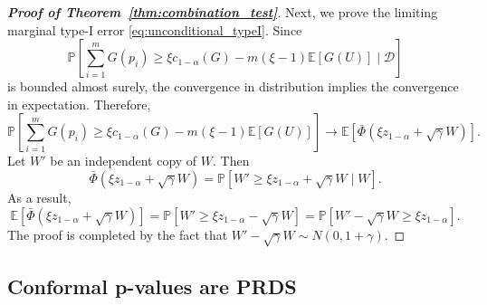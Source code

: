 \documentclass[11pt]{article}
\def\E{\mathbb{E}}
\renewcommand{\P}{\mathbb{P}}
\begin{document}
\begin{proof}[\textbf{Proof of Theorem~\ref{thm:combination_test}}]
Next, we prove the limiting marginal type-I error \eqref{eq:unconditional_typeI}. Since $$\P\left[\sum_{i=1}^{m}G(p_i)\ge \xi c_{1 - \alpha}(G) - m(\xi - 1)\E[G(U)] \mid \mathcal{D} \right]$$ is bounded almost surely, the convergence in distribution implies the convergence in expectation. Therefore,
\[\P\left[\sum_{i=1}^{m}G(p_i)\ge \xi c_{1 - \alpha}(G) - m(\xi - 1)\E[G(U)]\right] \rightarrow \E[\bar{\Phi}(\xi z_{1 - \alpha} + \sqrt{\gamma}W)].\]
Let $W'$ be an independent copy of $W$. Then
\[\bar{\Phi}(\xi z_{1 - \alpha} + \sqrt{\gamma}W) = \P\left[ W' \ge \xi z_{1 - \alpha} + \sqrt{\gamma}W\mid W\right].\]
As a result,
\[\E[\bar{\Phi}(\xi z_{1 - \alpha} + \sqrt{\gamma}W)] = \P\left[W' \ge \xi z_{1 - \alpha} - \sqrt{\gamma}W \right] = \P\left[W' - \sqrt{\gamma}W\ge \xi z_{1 - \alpha} \right].\]
The proof is completed by the fact that $W' - \sqrt{\gamma}W\sim N(0, 1 + \gamma)$.
 
\end{proof}


\subsection{Conformal p-values are PRDS}\label{app:PRDS}
\end{document}
